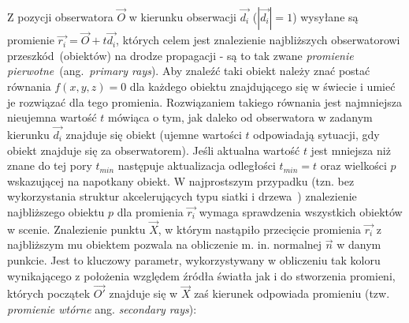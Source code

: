 Z pozycji obserwatora $\vec{O}$ w kierunku obserwacji $\vec{d_i}$ ($|\vec{d_i}| = 1$) wysyłane są promienie $\vec{r_i} = \vec{O} + t\vec{d_i}$, których celem jest znalezienie najbliższych obserwatorowi przeszkód~(obiektów) na drodze propagacji - są to tak zwane \textit{promienie pierwotne}~(ang.~\textit{primary rays}). Aby znaleźć taki obiekt należy znać postać równania $f(x, y, z) = 0$ dla każdego obiektu znajdującego się w świecie i umieć je rozwiązać dla tego promienia. Rozwiązaniem takiego równania jest najmniejsza nieujemna wartość $t$ mówiąca o tym, jak daleko od obserwatora w zadanym kierunku $\vec{d_i}$ znajduje się obiekt (ujemne wartości $t$ odpowiadają sytuacji, gdy obiekt znajduje się za obserwatorem). Jeśli aktualna wartość $t$ jest mniejsza niż znane do tej pory $t_{min}$ następuje aktualizacja odległości $t_{min} = t$ oraz wielkości $p$ wskazującej na napotkany obiekt. W najprostszym przypadku (tzn. bez wykorzystania struktur akcelerujących typu siatki i drzewa~\cite{VINKLER_PHD}) znalezienie najbliższego obiektu $p$ dla promienia $\vec{r_i}$ wymaga sprawdzenia wszystkich obiektów w scenie.
Znalezienie punktu $\vec{X}$, w którym nastąpiło przecięcie promienia $\vec{r_i}$ z najbliższym mu obiektem pozwala na obliczenie m. in. normalnej $\vec{n}$ w danym punkcie. Jest to kluczowy parametr, wykorzystywany w obliczeniu tak koloru wynikającego z położenia względem źródła światła jak i do stworzenia promieni, których początek $\vec{O'}$ znajduje się w $\vec{X}$ zaś kierunek odpowiada promieniu (tzw. \textit{promienie wtórne} ang. \textit{secondary rays}):
